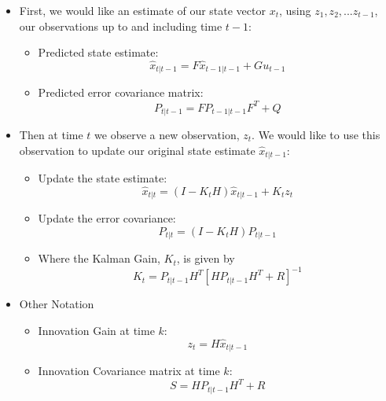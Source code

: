 \documentclass{article}
\begin{document}
\begin{itemize}
\item First, we would like an estimate of our state vector $x_t$, using $z_1, z_2, ... z_{t-1}$, our observations up to and including time $t-1$:
\begin{itemize}
\item Predicted state estimate: $$\hat x_{t|t-1} = F\hat x_{t-1|t-1} + Gu_{t-1}$$   
\item Predicted error covariance matrix: $$P_{t|t-1} = F P_{t-1|t-1}F^T + Q$$
\end{itemize}

\item Then at time $t$ we observe a new observation, $z_t$. We would like to use this observation to update our original state estimate $\hat x_{t|t-1}$:

\begin{itemize}
\item Update the state estimate: $$\hat x_{t|t} = (I - K_tH)\hat x_{t|t-1} + K_t z_t $$ 
\item Update the error covariance: $$P_{t|t} = (I - K_tH ) P_{t|t-1}$$
\item Where the Kalman Gain, $K_t$, is given by $$K_t = P_{t|t-1}H^T [H P_{t|t-1} H^T + R]^{-1}$$
\end{itemize}

\item Other Notation
\begin{itemize}
\item Innovation Gain at time $k$: $$ z_t =  H\hat x_{t|t-1}$$
\item Innovation Covariance matrix at time $k$: $$S = H P_{t|t-1} H^T + R $$
\end{itemize}

\end{itemize}
\newpage
\end{document}

